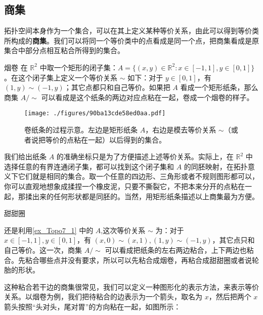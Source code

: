

\subsection{商集}

拓扑空间本身作为一个集合，可以在其上定义某种等价关系，由此可以得到等价类所构成的\textbf{商集}。我们可以将同一个等价类中的点看成是同一个点，把商集看成是原集合中部分点相互粘合所得到的集合。

\begin{example}{烟卷}\label{ex_Topo7_1}
在 $\mathbb{R}^2$ 中取一个矩形的闭子集：$A=\{(x,y)\in\mathbb{R}^2:x\in[-1,1],y\in[0,1]\}$。在这个闭子集上定义一个等价关系 $\sim$ 如下：对于 $y\in[0,1]$，有 $(1, y)\sim(-1, y)$；其它点都只和自己等价。如果把 $A$ 看成一个矩形纸条，那么商集 $A/\sim$ 可以看成是这个纸条的两边对应点粘在一起，卷成一个烟卷的样子。

\begin{figure}[ht]
\centering
\texttt{[image: ./figures/90ba13cde58ed0aa.pdf]}
\caption{卷纸条的过程示意。左边是矩形纸条 $A$，右边是模去等价关系 $\sim$（或者说把等价的点粘在一起）以后得到的集合。} \label{fig_Topo7_1}
\end{figure}

\end{example}



我们给出纸条 $A$ 的准确坐标只是为了方便描述上述等价关系。实际上，在 $\mathbb{R}^2$ 中选择任意的有界连通闭子集，都可以找到这个闭子集和 $A$ 的同胚映射，在拓扑意义下它们就是相同的集合。取一个任意的四边形、三角形或者不规则图形都可以，你可以直观地想象成揉捏一个橡皮泥，只要不撕裂它，不把本来分开的点粘在一起，那揉出来的任何形状都是同胚的。当然，用矩形纸条描述以上商集最为方便。

\begin{example}{甜甜圈}

还是利用\autoref{ex_Topo7_1} 中的 $A$,这次等价关系 $\sim$ 为：对于 $x\in[-1,1], y\in[0,1]$，有 $(x,0)\sim(x,1), (1, y)\sim(-1, y)$，其它点只和自己等价。这一次，商集 $A/\sim$ 可以看成把纸条的左右两边粘合，上下两边也粘合。先粘合哪些点并没有要求，所以可以先粘合成烟卷，再粘合成甜甜圈或者说轮胎的形状。

\end{example}

这种粘合若干边的商集很常见，我们可以定义一种图形化的表示方法，来表示等价关系。以烟卷为例，我们把待粘合的边表示为一个箭头，取名为 $x$，然后把两个 $x$ 箭头按照“头对头，尾对胃”的方向粘在一起，如图所示：

